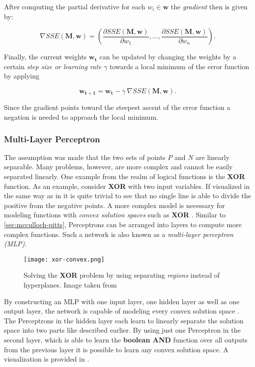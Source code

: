 After computing the partial derivative for each $w_i \in \bm{w}$ the \textit{gradient} then is given by:

\begin{equation}
    \nabla SSE(\bm{M}, \bm{w}) = \left(\frac{\partial SSE(\bm{M}, \bm{w})}{\partial w_1}, \dots, \frac{\partial SSE(\bm{M}, \bm{w})}{\partial w_n} \right).
\end{equation}

Finally, the current weights $\bm{w_t}$ can be updated by changing the weights by a certain \textit{step size or learning rate} $\gamma$ towards a local minimum of the error function by applying

\begin{equation}
    \label{eq:gradient-binary-update}
    \bm{w_{t+1}} = \bm{w_t} - \gamma ~ \nabla SSE(\bm{M}, \bm{w}).
\end{equation}

Since the gradient points toward the steepest ascent of the error function a negation is needed to approach the local minimum.

\subsubsection{Multi-Layer Perceptron}
The assumption was made that the two sets of points $P$ and $N$ are linearly separable.
Many problems, however, are more complex and cannot be easily separated linearly.
One example from the realm of logical functions is the \textbf{XOR} function.
As an example, consider \textbf{XOR} with two input variables.
If visualized in the same way as in  it is quite trivial to see that no single line is able to divide the positive from the negative points.
A more complex model is necessary for modeling functions with \textit{convex solution spaces} such as \textbf{XOR} .
Similar to \ref{sec:mcculloch-pitts}, Perceptrons can be arranged into layers to compute more complex functions.
Such a network is also known as a \textit{multi-layer perceptron (MLP)}.

\begin{figure}[htb!]
    \centering
    \texttt{[image: xor-convex.png]}
    \caption{Solving the \textbf{XOR} problem by using separating \textit{regions} instead of hyperplanes. Image taken from \cite{rojas_neural_1996}}
    \label{fig:xor-convex}
\end{figure}

By constructing an MLP with one input layer, one hidden layer as well as one output layer, the network is capable of modeling every convex solution space \cite{rojas_neural_1996}.
The Perceptrons in the hidden layer each learn to linearly separate the solution space into two parts like described earlier.
By using just one Perceptron in the second layer, which is able to learn the \textbf{boolean AND} function over all outputs from the previous layer it is possible to learn any convex solution space.
A visualization is provided in .

